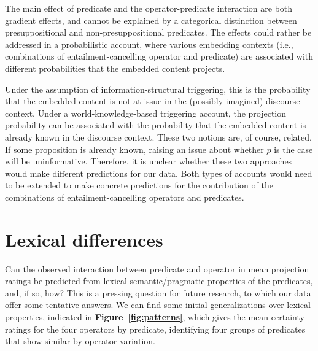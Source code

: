 \documentclass[a4paper,12pt,twoside]{article}
\begin{document}
		The main effect of predicate and the operator-predicate interaction are both gradient effects, and cannot be explained by a categorical distinction between presuppositional and non-pre\-suppo\-si\-tion\-al predicates. The effects could rather be addressed in a probabilistic account, where various embedding contexts (i.e., combinations of entailment-cancelling operator and predicate) are associated with different probabilities that the embedded content projects.

		Under the assumption of information-structural triggering, this is the probability that the embedded content is not at issue in the (possibly imagined) discourse context. Under a world-knowledge-based triggering account, the projection probability can be associated with the probability that the embedded content is already known in the discourse context. These two notions are, of course, related. If some proposition is already known, raising an issue about whether $p$ is the case will be uninformative. Therefore, it is unclear whether these two approaches would make different predictions for our data. Both types of accounts would need to be extended to make concrete predictions for the contribution of the combinations of entailment-cancelling operators and predicates.

\section{Lexical differences}
	Can the observed interaction between predicate and operator in mean projection ratings be predicted from lexical semantic/pragmatic properties of the predicates, and, if so, how?
	This is a pressing question for future research, to which our data offer some tentative answers. We can find some initial generalizations over lexical properties, indicated in \textbf{Figure~\ref{fig:patterns}}, which gives the mean certainty ratings for the four operators by predicate, identifying four groups of predicates that show similar by-operator variation.
	
\end{document}
